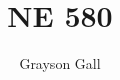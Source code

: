 \documentclass{article}
\title{\textbf{NE 580}}
\author{Grayson Gall}
\theoremstyle{definition}
\begin{document}
\maketitle
\newpage

\section{}



\end{document}
